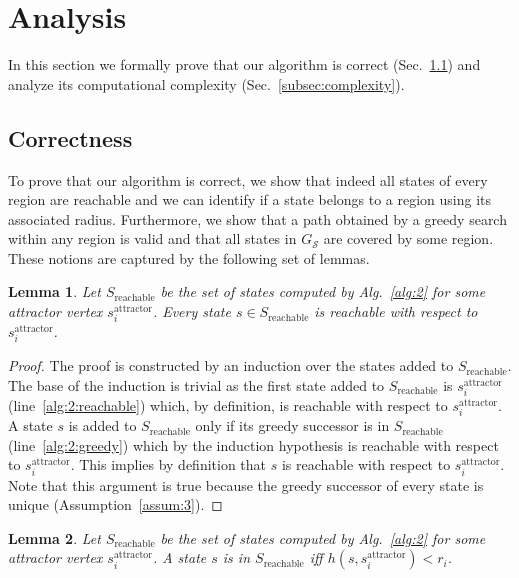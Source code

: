 \documentclass[letterpaper]{article} %
\newcommand{\calS}{\ensuremath{\mathcal{S}}\xspace}
\newcommand{\sAttract}{\ensuremath{s^{\text{attractor}}_i}\xspace}
\newtheorem{lemma}{Lemma}
\begin{document}
\section {Analysis}
\label{sec:analysis}
In this section we formally prove that 
our algorithm is correct (Sec.~\ref{subsec:correct}) and 
analyze its computational complexity (Sec.~\ref{subsec:complexity}).

\subsection{Correctness}
\label{subsec:correct}
To prove that our algorithm is correct, we show that indeed all states of every region are reachable and we can identify if a state belongs to a region using its associated radius.
Furthermore, we show that a path obtained by a greedy search within any region is valid and that all states in $G_\calS$ are covered by some region.
These notions are captured by the following set of lemmas.

\vspace{2mm}
\begin{lemma}
\label{lemma:reachable-1}
Let $S_{\text{reachable}}$ be the set of states computed by Alg.~\ref{alg:2} for some attractor vertex \sAttract.
%
Every state $s \in S_{\text{reachable}}$ is reachable with respect to \sAttract.
\end{lemma}
%
\begin{proof}
The proof is constructed by an induction over the states added to $S_{\text{reachable}}$.
The base of the induction is trivial as the first state added to $S_{\text{reachable}}$  is \sAttract (line~\ref{alg:2:reachable}) which, by definition, is reachable with respect to \sAttract.
%
A state $s$ is added to $S_{\text{reachable}}$ only if its greedy successor is in $S_{\text{reachable}}$ (line~\ref{alg:2:greedy}) which by the induction hypothesis is reachable with respect to \sAttract.
This implies by definition that $s$ is reachable with respect to \sAttract.
%
Note that this argument is true because the greedy successor of every state is unique (Assumption~\ref{assum:3}).
\end{proof}

\begin{lemma}
\label{lemma:reachable-2}
Let $S_{\text{reachable}}$ be the set of states computed by Alg.~\ref{alg:2} for some attractor vertex \sAttract.
%
A state $s$ is in $S_{\text{reachable}}$ iff $h(s, \sAttract) < r_i$.
\end{lemma}
\end{document}
